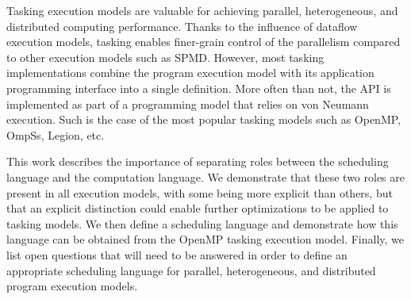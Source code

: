 Tasking execution models are valuable for achieving parallel, heterogeneous, and distributed computing performance. Thanks to the influence of dataflow execution models, tasking enables finer-grain control of the parallelism compared to other execution models such as SPMD. However, most tasking implementations combine the program execution model with its application programming interface into a single definition. More often than not, the API is implemented as part of a programming model that relies on von Neumann execution. Such is the case of the most popular tasking models such as OpenMP, OmpSs, Legion, etc.


This work describes the importance of separating roles between the scheduling language and the computation language. We demonstrate that these two roles are present in all execution models, with some being more explicit than others, but that an explicit distinction could enable further optimizations to be applied to tasking models. We then define a scheduling language and demonstrate how this language can be obtained from the OpenMP tasking execution model. Finally, we list open questions that will need to be answered in order to define an appropriate scheduling language for parallel, heterogeneous, and distributed program execution models.


